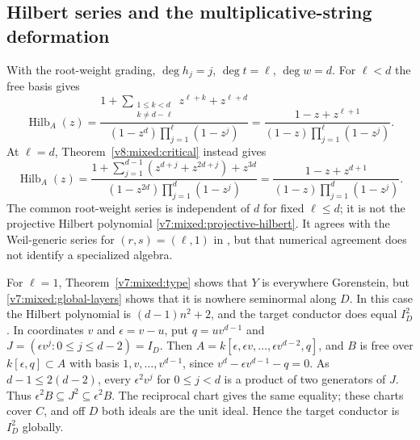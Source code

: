 \documentclass[10pt,fleqn]{article}
\numberwithin{equation}{section}
\newcommand{\Hilb}{\operatorname{Hilb}}
\begin{document}
\subsection{Hilbert series and the multiplicative-string deformation}
\label{r17:mixed:deformation}

With the root-weight grading, $\deg h_j=j$, $\deg t=\ell$, $\deg w=d$.
For $\ell<d$ the free basis gives
\begin{equation}\label{v7:mixed:weighted-hilbert}
 \Hilb_A(z)=
 \frac{1+\sum_{\substack{1\le k<d\\k\ne d-\ell}}z^{\ell+k}+z^{\ell+d}}
 {(1-z^d)\prod_{j=1}^\ell(1-z^j)}
 =\frac{1-z+z^{\ell+1}}{(1-z)\prod_{j=1}^\ell(1-z^j)}.
\end{equation}
At $\ell=d$, Theorem~\ref{v8:mixed:critical} instead gives
\begin{equation}\label{v8:mixed:critical-hilbert}
 \Hilb_A(z)=
 \frac{1+\sum_{j=1}^{d-1}(z^{d+j}+z^{2d+j})+z^{3d}}
 {(1-z^{2d})\prod_{j=1}^{d}(1-z^j)}
 =\frac{1-z+z^{d+1}}{(1-z)\prod_{j=1}^{d}(1-z^j)}.
\end{equation}
The common root-weight series is independent of $d$ for fixed $\ell\le d$;
it is not the projective Hilbert polynomial
\eqref{v7:mixed:projective-hilbert}.  It agrees with the Weil-generic
series for $(r,s)=(\ell,1)$ in
\cite[Theorem~3.2(ii)]{EtingofRains}, but that numerical
agreement does not identify a specialized algebra.

For $\ell=1$, Theorem~\ref{v7:mixed:type} shows that $Y$ is everywhere
Gorenstein, but \eqref{v7:mixed:global-layers} shows that it is nowhere
seminormal along $D$.  In this case the Hilbert polynomial is
$(d-1)n^2+2$, and the target conductor does equal $I_D^2$.
In coordinates $v$ and $\epsilon=v-u$, put
$q=uv^{d-1}$ and
$J=(\epsilon v^j:0\le j\le d-2)=I_D$.
Then $A=k[\epsilon,\epsilon v,\ldots,\epsilon v^{d-2},q]$,
and $B$ is free over $k[\epsilon,q]\subset A$ with basis
$1,v,\ldots,v^{d-1}$, since
$v^d-\epsilon v^{d-1}-q=0$.
As $d-1\le2(d-2)$, every $\epsilon^2v^j$ for $0\le j<d$
is a product of two generators of $J$.
Thus $\epsilon^2B\subseteq J^2\subseteq\epsilon^2B$.
The reciprocal chart gives the same equality; these charts
cover $C$, and off $D$ both ideals are the unit ideal.
Hence the target conductor is $I_D^2$ globally.
\end{document}
